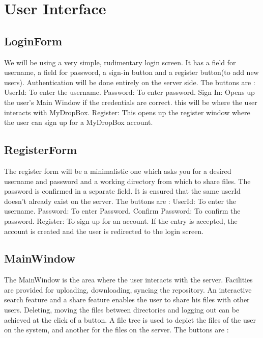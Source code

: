 \documentclass[]{article}
\begin{document}
\section{\LARGE User Interface}
\subsection{LoginForm}
We will be using a very simple, rudimentary login screen. It has a field for username, a field for password, a sign-in button and a register button(to add new users). Authentication will be done entirely on the server side. 
The buttons are :
UserId: To enter the username.
Password: To enter password.
Sign In: Opens up the user's Main Window if the credentials are correct. this will be where the user interacts with MyDropBox.
Register: This opens up the register window where the user can sign up for a MyDropBox account.



\subsection{RegisterForm}
The register form will be a minimalistic one which asks you for a desired username and password and a working directory from which to share files. The password is confirmed in a separate field. It is ensured that the same userId doesn't already exist on the server. 
The buttons are :
UserId: To enter the username.
Password: To enter Password.
Confirm Password: To confirm the password.
Register: To sign up for an account. If the entry is accepted, the account is created and the user is redirected to the login screen.  


\subsection{MainWindow}
The MainWindow is the area where the user interacts with the server. Facilities are provided for uploading, downloading, syncing the repository. An interactive search feature and a share feature enables the user to share his files with other users. Deleting, moving the files between directories and logging out can be achieved at the click of a button. A file tree is used to depict the files of the user on the system, and another for the files on the server.
The buttons are :
\end{document}

